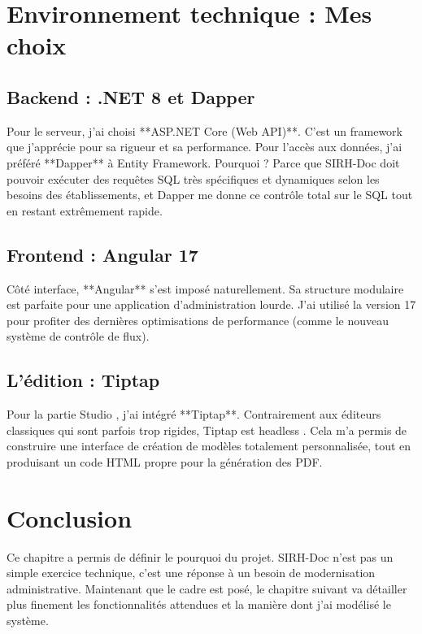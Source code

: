 \section{Environnement technique : Mes choix}

\subsection{Backend : .NET 8 et Dapper}
Pour le serveur, j'ai choisi **ASP.NET Core (Web API)**. C'est un framework que j'apprécie pour sa rigueur et sa performance. Pour l'accès aux données, j'ai préféré **Dapper** à Entity Framework. Pourquoi ? Parce que SIRH-Doc doit pouvoir exécuter des requêtes SQL très spécifiques et dynamiques selon les besoins des établissements, et Dapper me donne ce contrôle total sur le SQL tout en restant extrêmement rapide.

\subsection{Frontend : Angular 17}
Côté interface, **Angular** s'est imposé naturellement. Sa structure modulaire est parfaite pour une application d'administration lourde. J'ai utilisé la version 17 pour profiter des dernières optimisations de performance (comme le nouveau système de contrôle de flux).

\subsection{L'édition : Tiptap}
Pour la partie \og Studio \fg{}, j'ai intégré **Tiptap**. Contrairement aux éditeurs classiques qui sont parfois trop rigides, Tiptap est \og headless \fg{}. Cela m'a permis de construire une interface de création de modèles totalement personnalisée, tout en produisant un code HTML propre pour la génération des PDF.

\section{Conclusion}

Ce chapitre a permis de définir le \og pourquoi \fg{} du projet. SIRH-Doc n'est pas un simple exercice technique, c'est une réponse à un besoin de modernisation administrative. Maintenant que le cadre est posé, le chapitre suivant va détailler plus finement les fonctionnalités attendues et la manière dont j'ai modélisé le système.
